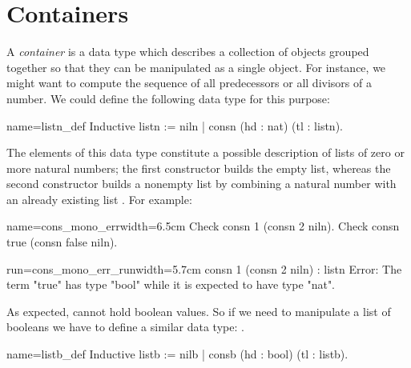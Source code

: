 

\section{Containers}\label{sec:poly}


A \emph{container} is a data type which describes a collection of
objects grouped together so that they can be manipulated as a single
object. For instance, we might want to compute the sequence of all
predecessors or all divisors of a number.  We could define the
following data type for this purpose:

\begin{coq}{name=listn_def}{}
Inductive listn := niln | consn (hd : nat) (tl : listn).
\end{coq}

The elements of this data type constitute a possible description of
lists of zero or more natural numbers; the first constructor
 builds the empty list, whereas the second constructor
 builds a nonempty list by combining a natural number 
with an already existing list .
For example:

\begin{coq-left}{name=cons_mono_err}{width=6.5cm}
Check consn 1 (consn 2 niln).
Check consn true (consn false niln).
$~$
$~$
\end{coq-left}{}{}
\begin{coqout-right}{run=cons_mono_err_run}{width=5.7cm}
consn 1 (consn 2 niln) : listn
Error: The term "true" has
type "bool" while it is
expected to have type "nat".
\end{coqout-right}{}{}

As expected,  %
cannot hold boolean values.
So if we need to
manipulate a list of booleans we have to define a similar data type:
.

\begin{coq}{name=listb_def}{}
Inductive listb := nilb | consb (hd : bool) (tl : listb).
\end{coq}

